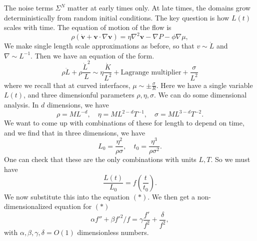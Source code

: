 \documentclass[a4paper]{article}
\begin{document}
The noise terms $\Sigma^N$ matter at early times only. At late times, the domains grow deterministically from random initial conditions. The key question is how $L(t)$ scales with time. The equation of motion of the flow is
\[
  \rho(\dot{\mathbf{v}} + \mathbf{v} \cdot \nabla \mathbf{v}) = \eta \nabla^2 \mathbf{v} - \nabla P - \phi \nabla \mu,
\]
We make single length scale approximations as before, so that $v \sim \dot{L}$ and $\nabla \sim L^{-1}$. Then we have an equation of the form.
\[
  \rho \ddot{L} + \rho \frac{\dot{L}^2}{L} \sim \eta \frac{\dot{K}}{L^2} + \text{Lagrange multiplier} + \frac{\sigma}{L^2}\tag{$*$} %
\]
where we recall that at curved interfaces, $\mu \sim \pm \frac{\sigma}{R}$. Here we have a single variable $L(t)$, and three dimensionful parameters $\rho, \eta, \sigma$.
We can do some dimensional analysis. In $d$ dimensions, we have
\[
  \rho = ML^{-d},\quad \eta = M L^{2 - d} T^{-1},\quad \sigma = ML^{3 - d} T^{-2}.
\]
We want to come up with combinations of these for length to depend on time, and we find that in three dimensions, we have
\[
  L_0 = \frac{\eta^2}{\rho \sigma},\quad t_0 = \frac{\eta^3}{\rho \sigma^2}.
\]
One can check that these are the only combinations with units $L, T$. So we must have
\[
  \frac{L(t)}{L_0} = f \left(\frac{t}{t_0}\right).
\]
We now substitute this into the equation $(*)$. We then get a non-dimensionalized equation for $(*)$
\[
  \alpha f'' + \beta f'^2/f = \gamma \frac{f'}{f^2} + \frac{\delta}{f^2},
\]
with $\alpha, \beta, \gamma, \delta = O(1)$ dimensionless numbers.
\end{document}
